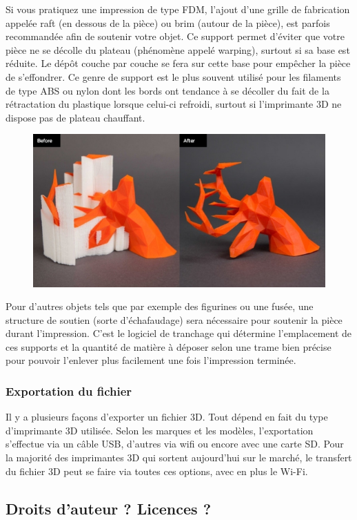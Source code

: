 \documentclass{article}
\begin{document}
Si vous pratiquez une impression de type FDM, l'ajout d'une grille de fabrication appelée raft (en dessous de la pièce) ou brim (autour de la pièce), est parfois recommandée afin de soutenir votre objet. Ce support permet d'éviter que votre pièce ne se décolle du plateau (phénomène appelé warping), surtout si sa base est réduite. Le dépôt couche par couche se fera sur cette base pour empêcher la pièce de s'effondrer. Ce genre de support est le plus souvent utilisé pour les filaments de type ABS ou nylon dont les bords ont tendance à se décoller du fait de la rétractation du plastique lorsque celui-ci refroidi, surtout si l'imprimante 3D ne dispose pas de plateau chauffant.
\begin{figure}[h!]
\centering
\includegraphics[scale=0.4]{./images/raft-cerf.png}
\end{figure}\hfill

Pour d'autres objets tels que par exemple des figurines ou une fusée, une structure de soutien (sorte d'échafaudage) sera nécessaire pour soutenir la pièce durant l'impression. C'est le logiciel de tranchage qui détermine l'emplacement de ces supports et la quantité de matière à déposer selon une trame bien précise pour pouvoir l'enlever plus facilement une fois l'impression terminée.
\newpage
\subsubsection{Exportation du fichier}
Il y a plusieurs façons d'exporter un fichier 3D. Tout dépend en fait du type d'imprimante 3D utilisée. Selon les marques et les modèles, l'exportation s'effectue via un câble USB, d'autres via wifi ou encore avec une carte SD. Pour la majorité des imprimantes 3D qui sortent aujourd'hui sur le marché, le transfert du fichier 3D peut se faire via toutes ces options, avec en plus le Wi-Fi.
\subsection{Droits d'auteur ? Licences ?}
\end{document}
